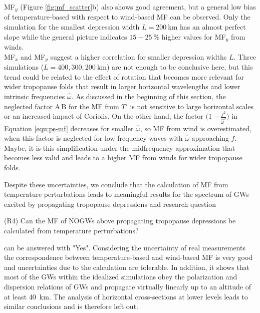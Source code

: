 MF$_y$ (Figure \ref{fig:mf_scatter}b) also shows good agreement, but a general low bias of temperature-based with respect to wind-based MF can be observed. Only the simulation for the smallest depression width $L=\SI{200}{\kilo\meter}$ has an almost perfect slope while the general picture indicates $15-\SI{25}{\percent}$ higher values for MF$_y$ from winds.\\
MF$_x$ and MF$_y$ suggest a higher correlation for smaller depression widths $L$. Three simulations ($L=400,300,\SI{200}{\kilo\meter}$) are not enough to be conclusive here, but this trend could be related to the effect of rotation that becomes more relevant for wider tropopause folds that result in larger horizontal wavelengths and lower intrinsic frequencies $\hat{\omega}$. As discussed in the beginning of this section, the neglected factor $\textrm{A} \, \textrm{B}$ for the MF from $T'$ is not sensitive to large horizontal scales or an increased impact of Coriolis. On the other hand, the factor $\bigl(1-\frac{f^2}{\hat{\omega}^2}\bigr)$ in Equation \ref{equ:ps-mf} decreases for smaller $\hat{\omega}$, so MF from wind is overestimated, when this factor is neglected for low frequency waves with $\hat{\omega}$ approaching $f$. Maybe, it is this simplification under the midfrequency approximation that becomes less valid and leads to a higher MF from winds for wider tropopause folds.

Despite these uncertainties, we conclude that the calculation of MF from temperature perturbations leads to meaningful results for the spectrum of GWs excited by propagating tropopause depressions and research question 
\begin{tcolorbox}[]
    (R4) Can the MF of NOGWs above propagating tropopause depressions be calculated from temperature perturbations?
\end{tcolorbox}
can be answered with "Yes". Considering the uncertainty of real measurements the correspondence between temperature-based and wind-based MF is very good and uncertainties due to the calculation are tolerable. In addition, it shows that most of the GWs within the idealized simulations obey the polarization and dispersion relations of GWs and propagate virtually linearly up to an altitude of at least \SI{40}{\kilo\meter}. The analysis of horizontal cross-sections at lower levels leads to similar conclusions and is therefore left out.



